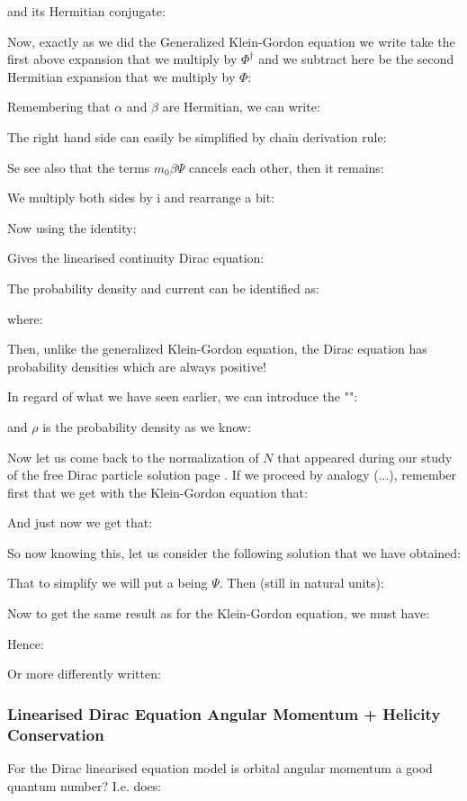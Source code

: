 	and its Hermitian conjugate:
	
	Now, exactly as we did the Generalized Klein-Gordon equation we write take the first above expansion that we multiply by $\Phi^\dagger$ and we subtract here be the second Hermitian expansion that we multiply by $\Phi$:
	
	Remembering that $\alpha$ and $\beta$ are Hermitian, we can write:
	
	The right hand side can easily be simplified by chain derivation rule:
	
	Se see also that the terms $m_0\beta\Psi$ cancels each other, then it remains:
	
	We multiply both sides by $\mathrm{i}$ and rearrange a bit:
	
	Now using the identity:
	
	Gives the linearised continuity Dirac equation:
	
	The probability density and current  can be identified as:
	
	where:
	
	Then, unlike the generalized Klein-Gordon equation, the Dirac equation has probability densities which are always positive!
	
	In regard of what we have seen earlier, we can introduce the "":
	
	and $\rho$ is the probability density as we know:
	
	
	\label{normalization dirac free particle solution}Now let us come back to the normalization of $N$ that appeared during our study of the free Dirac particle solution page \pageref{free particle dirac equation involving factor N}. If we proceed by analogy (...), remember first that we get with the Klein-Gordon equation that:
	
	And just now we get that:
	
	So now knowing this, let us consider the following solution that we have obtained:
	
	That to simplify we will put a being $\Psi$. Then (still in natural units):
	
	Now to get the same result as for the Klein-Gordon equation, we must have:
	
	Hence:
	
	Or more differently written:
	
	
	\subsubsection{Linearised Dirac Equation Angular Momentum + Helicity Conservation}
	For the Dirac linearised equation model is orbital angular momentum a good quantum number? I.e. does:
	
